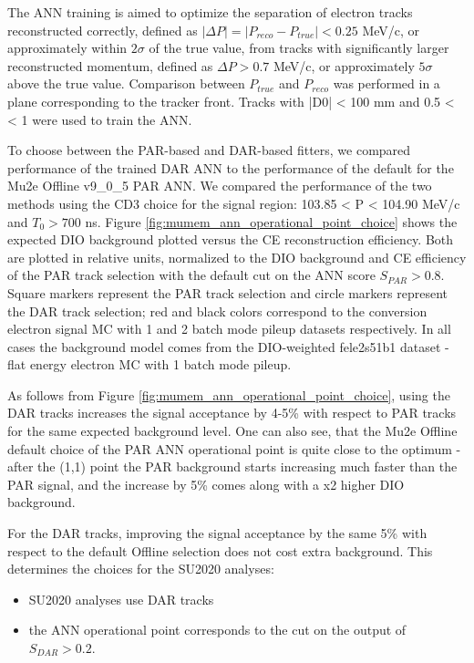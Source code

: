 The ANN training is aimed to optimize the separation of electron tracks reconstructed correctly, 
defined as $ |\Delta{P}| = |P_{reco}-P_{true}| < 0.25$ MeV/c, or approximately within $2\sigma$ of
the true value, from tracks with significantly larger reconstructed momentum, defined as
$\Delta{P} > 0.7$ MeV/c, or approximately $5\sigma$ above the true value.
%
Comparison between $P_{true}$ and $P_{reco}$ was performed in a plane corresponding to the tracker front.
%
Tracks with |D0| < 100 mm and 0.5 < \tandip < 1 were used to train the ANN.

To choose between the PAR-based and DAR-based fitters, we compared performance of the
trained DAR ANN to the performance of the default for the Mu2e Offline v9\_0\_5 PAR ANN.
%
We compared the performance of the two methods using the CD3 choice for the signal region:
103.85 < P < 104.90 MeV/c and $T_0 > 700$ ns.
%
Figure \ref{fig:mumem_ann_operational_point_choice} shows the expected DIO background plotted
versus the CE reconstruction efficiency. Both are plotted in relative units, normalized
to the DIO background and CE efficiency of the PAR track selection with the default
cut on the ANN score $S_{PAR} > 0.8$.
%
Square markers represent the PAR track selection and circle markers represent the DAR track selection;
red and black colors correspond to the conversion electron signal MC with 1 and 2 batch mode pileup 
datasets respectively.
%
In all cases the background model comes from the DIO-weighted fele2s51b1 dataset - 
flat energy electron MC with 1 batch mode pileup. 

As follows from Figure \ref{fig:mumem_ann_operational_point_choice},
using the DAR tracks increases the signal acceptance by 4-5\% with respect to PAR tracks for the same expected
background level. One can also see, that the Mu2e Offline default choice of the PAR ANN operational point
is quite close to the optimum - after the (1,1) point the PAR background starts increasing much faster than
the PAR signal, and the increase by 5\% comes along with a x2 higher DIO background.

For the DAR tracks, improving the signal acceptance by the same 5\% with respect to the default
Offline selection does not cost extra background. This determines the choices for the SU2020 analyses: 

\begin{itemize}
\item
  SU2020 analyses use DAR tracks
\item
  the ANN operational point corresponds to the cut on the output of $S_{DAR} > 0.2$.
\end{itemize}


